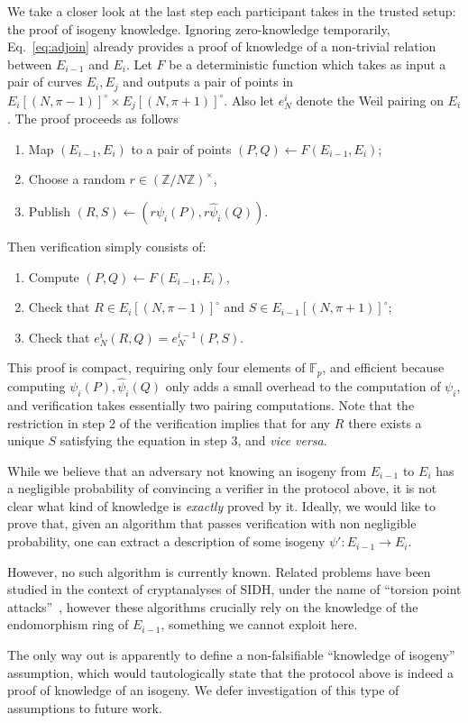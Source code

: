 \documentclass{llncs}
\newcommand{\Z}{\mathbb{Z}}
\newcommand{\F}{\mathbb{F}}
\begin{document}
We take a closer look at the last step each participant takes in the
trusted setup: the proof of isogeny knowledge. %
Ignoring zero-knowledge temporarily, Eq.~\eqref{eq:adjoin} already
provides a proof of knowledge of a non-trivial relation between
$E_{i-1}$ and $E_i$. %
Let $F$ be a deterministic function which takes as input a pair of
curves $E_i,E_j$ and outputs a pair of points in
$E_i[(N,\pi-1)]^\circ \times E_j[(N,\pi+1)]^\circ$. %
Also let $e_N^i$ denote the Weil pairing on $E_i$.  The proof proceeds
as follows
\begin{enumerate}
\item Map $(E_{i-1},E_i)$ to a pair of points
  $(P,Q) \gets F(E_{i-1},E_i)$;
\item Choose a random $r\in(\Z/N\Z)^\times$,
\item Publish $(R,S) \gets (r\psi_i(P), r\hat\psi_i(Q))$.
\end{enumerate}
Then verification simply consists of:
\begin{enumerate}
\item Compute $(P,Q)\gets F(E_{i-1},E_i)$,
\item Check that $R\in E_i[(N,\pi-1)]^\circ$ and
  $S\in E_{i-1}[(N,\pi+1)]^\circ$;
\item Check that $e_N^i(R,Q) = e_N^{i-1}(P,S)$.
\end{enumerate}

This proof is compact, requiring only four elements of $\F_p$, and
efficient because computing $\psi_i(P),\hat\psi_i(Q)$ only adds a
small overhead to the computation of $\psi_i$, and verification takes
essentially two pairing computations. %
Note that the restriction in step 2 of the verification implies that
for any $R$ there exists a unique $S$ satisfying the equation in step
3, and \emph{vice versa}.

\begin{remark}
  \label{rk:non-falsifiable}
  While we believe that an adversary not knowing an isogeny from
  $E_{i-1}$ to $E_i$ has a negligible probability of convincing a
  verifier in the protocol above, it is not clear what kind of knowledge
  is \emph{exactly} proved by it. %
  Ideally, we would like to prove that, given an algorithm that passes
  verification with non negligible probability, one can extract a
  description of some isogeny $\psi':E_{i-1}\to E_{i}$. %

  However, no such algorithm is currently known. %
  Related problems have been studied in the context of cryptanalyses
  of SIDH, under the name of ``torsion point
  attacks''~\cite{10.1007/978-3-319-70697-9_12,cryptoeprint:2019:1291,cryptoeprint:2020:633},
  however these algorithms crucially rely on the knowledge of the
  endomorphism ring of $E_{i-1}$, something we cannot exploit here.

  The only way out is apparently to define a non-falsifiable
  ``knowledge of isogeny'' assumption, which would tautologically
  state that the protocol above is indeed a proof of knowledge of an
  isogeny. %
  We defer investigation of this type of assumptions to future work.
\end{remark}
\end{document}
